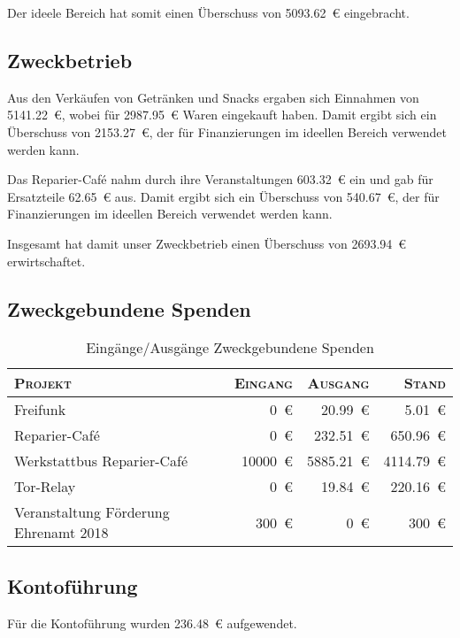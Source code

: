 \documentclass[ngerman]{scrartcl}
\begin{document}
Der ideele Bereich hat somit einen Überschuss von \num{5093,62}~\euro{} eingebracht.

\subsection{Zweckbetrieb}
\label{sec:Zweckbetrieb}
Aus den Verkäufen von Getränken und Snacks ergaben sich Einnahmen von \num{5141,22}~\euro{}, wobei für \num{2987,95}~\euro{} Waren eingekauft haben.
Damit ergibt sich ein Überschuss von \num{2153,27}~\euro{}, der für Finanzierungen im ideellen Bereich verwendet werden kann.

Das Reparier-Café nahm durch ihre Veranstaltungen \num{603,32}~\euro{} ein und gab für Ersatzteile \num{62,65}~\euro{} aus.
Damit ergibt sich ein Überschuss von \num{540,67}~\euro{}, der für Finanzierungen im ideellen Bereich verwendet werden kann.

Insgesamt hat damit unser Zweckbetrieb einen Überschuss von \num{2693,94}~\euro{} erwirtschaftet.

\subsection{Zweckgebundene Spenden}
\label{sec:zweckgebundene_spenden}


\begin{table}[h]
        \centering
        \begin{tabular}{l|r|r|r}
        \toprule
        \textsc{Projekt} & \textsc{Eingang} & \textsc{Ausgang} & \textsc{Stand} \\
        \midrule
        Freifunk & \num{0}~\euro{} & \num{20,99}~\euro{} & \num{5,01}~\euro{} \\
        Reparier-Café & \num{0}~\euro{} & \num{232,51}~\euro{} & \num{650,96}~\euro{} \\
        Werkstattbus Reparier-Café & \num{10000}~\euro{} & \num{5885,21}~\euro{} & \num{4114,79}~\euro{} \\
        Tor-Relay & \num{0}~\euro{} & \num{19,84}~\euro{} & \num{220,16}~\euro{} \\
        Veranstaltung Förderung Ehrenamt 2018 & \num{300}~\euro{} & \num{0}~\euro{} & \num{300}~\euro{} \\
\bottomrule
        \end{tabular}
        \caption{Eingänge/Ausgänge Zweckgebundene Spenden}
        \label{table:spenden}
\end{table}

\subsection{Kontoführung}
\label{sec:Kontoführung}
Für die Kontoführung wurden \num{236,48}~\euro{} aufgewendet.
\end{document}
